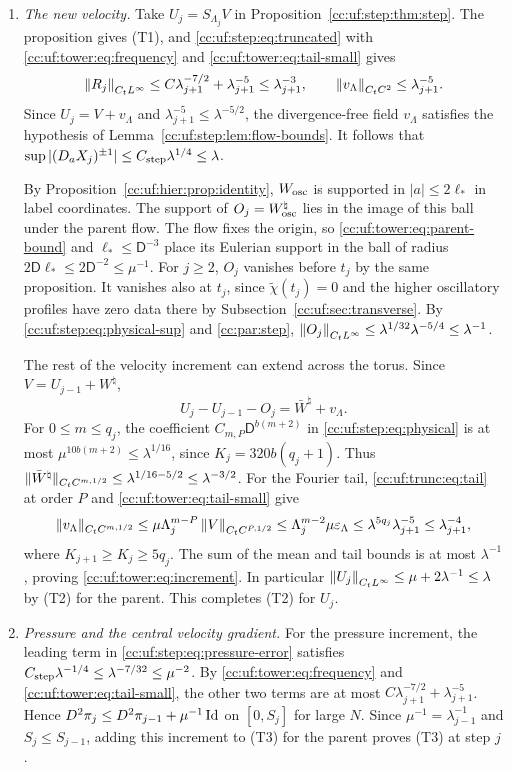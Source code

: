 \begin{enumerate}[leftmargin=*]
\item \emph{The new velocity.}
Take $U_j=S_{\Lambda_j}V$ in Proposition~\ref{cc:uf:step:thm:step}.
The proposition gives (T1), and \eqref{cc:uf:step:eq:truncated} with
\eqref{cc:uf:tower:eq:frequency} and \eqref{cc:uf:tower:eq:tail-small} gives
\[
 \left\lVert R_j\right\rVert_{C_tL^\infty}\le C\lambda_{j+1}^{-7/2}+\lambda_{j+1}^{-5}
 \le\lambda_{j+1}^{-3},\qquad
 \left\lVert v_\Lambda\right\rVert_{C_tC^2}\le\lambda_{j+1}^{-5}.
\]
Since $U_j=V+v_\Lambda$ and $\lambda_{j+1}^{-5}\le\lambda^{-5/2}$,
the divergence-free field $v_\Lambda$ satisfies the hypothesis of
Lemma~\ref{cc:uf:step:lem:flow-bounds}. It follows that
$\sup|(D_aX_j)^{\pm1}|\le C_{\rm step}\lambda^{1/4}\le\lambda$.

By Proposition~\ref{cc:uf:hier:prop:identity}, $W_{\rm osc}$ is supported
in $|a|\le2\ell_*$ in label coordinates. The support of
$O_j=W_{\rm osc}^\natural$ lies in the image of this ball under the
parent flow. The flow fixes the origin, so
\eqref{cc:uf:tower:eq:parent-bound} and $\ell_*\le\mathsf D^{-3}$
place its Eulerian support in the ball of radius
$2\mathsf D\ell_*\le2\mathsf D^{-2}\le\mu^{-1}$.
For $j\ge2$, $O_j$ vanishes before $t_j$ by the same proposition.
It vanishes also at $t_j$, since $\widetilde\chi(t_j)=0$ and the higher
oscillatory profiles have zero data there by Subsection~\ref{cc:uf:sec:transverse}.
By \eqref{cc:uf:step:eq:physical-sup} and \eqref{cc:par:step},
$\left\lVert O_j\right\rVert_{C_tL^\infty}\le\lambda^{1/32}\lambda^{-5/4}\le\lambda^{-1}$.

The rest of the velocity increment can extend across the torus. Since
$V=U_{j-1}+W^\natural$,
\[
 U_j-U_{j-1}-O_j=\bar W^\natural+v_\Lambda .
\]
For $0\le m\le q_j$, the coefficient $C_{m,P}\mathsf D^{b(m+2)}$
in \eqref{cc:uf:step:eq:physical} is at most $\mu^{10b(m+2)}\le
\lambda^{1/16}$, since $K_j=320b(q_j+1)$. Thus
$\|\bar W^\natural\|_{C_tC^{m,1/2}}\le\lambda^{1/16-5/2}
\le\lambda^{-3/2}$. For the Fourier tail, \eqref{cc:uf:trunc:eq:tail}
at order $P$ and \eqref{cc:uf:tower:eq:tail-small} give
\[
 \|v_\Lambda\|_{C_tC^{m,1/2}}
 \le\mu\Lambda_j^{m-P}\left\lVert V\right\rVert_{C_tC^{P,1/2}}
 \le\Lambda_j^{m-2}\mu\varepsilon_\Lambda
 \le\lambda^{5q_j}\lambda_{j+1}^{-5}\le\lambda_{j+1}^{-4},
\]
where $K_{j+1}\ge K_j\ge5q_j$. The sum of the mean and tail bounds is
at most $\lambda^{-1}$, proving \eqref{cc:uf:tower:eq:increment}.
In particular $\left\lVert U_j\right\rVert_{C_tL^\infty}\le\mu+2\lambda^{-1}\le\lambda$
by (T2) for the parent. This completes (T2) for $U_j$.

\item \emph{Pressure and the central velocity gradient.}
For the pressure increment, the leading term in \eqref{cc:uf:step:eq:pressure-error}
satisfies $C_{\rm step}\lambda^{-1/4}\le\lambda^{-7/32}\le\mu^{-2}$.
By \eqref{cc:uf:tower:eq:frequency} and \eqref{cc:uf:tower:eq:tail-small},
the other two terms are at most $C\lambda_{j+1}^{-7/2}+\lambda_{j+1}^{-5}$.
Hence $D^2\pi_j\le D^2\pi_{j-1}+\mu^{-1}\operatorname{Id}$ on $[0,S_j]$ for large $N$.
Since $\mu^{-1}=\lambda_{j-1}^{-1}$ and $S_j\le S_{j-1}$, adding this
increment to (T3) for the parent proves (T3) at step $j$.


\end{enumerate}
